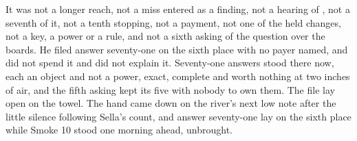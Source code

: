 It was not a longer reach, not a miss entered as a finding, not a hearing of , not a seventh of it, not a tenth stopping, not a payment, not one of the held changes, not a key, a power or a rule, and not a sixth asking of the question over the boards. He filed answer seventy-one on the sixth place with no payer named, and did not spend it and did not explain it. Seventy-one answers stood there now, each an object and not a power, exact, complete and worth nothing at two inches of air, and the fifth asking kept its five with nobody to own them. The file lay open on the towel. The hand came down on the river's next low note after the little silence following Sella's count, and answer seventy-one lay on the sixth place while Smoke 10 stood one morning ahead, unbrought.
